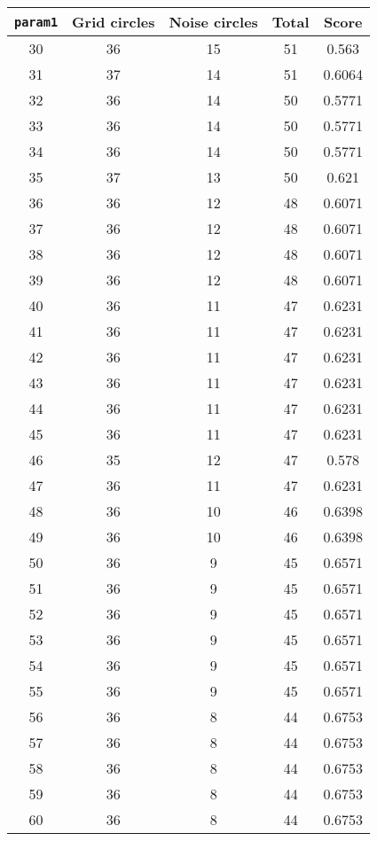 \documentclass[letterpaper, 12pt]{article}
\begin{document}
\begin{longtable}{|c|c|c|c|c|}
\hline
\textbf{\texttt{param1}} & \textbf{Grid circles} & \textbf{Noise circles} & \textbf{Total} & \textbf{Score} \\
\hline
30 & 36 & 15 & 51 & 0.563 \\
\hline
31 & 37 & 14 & 51 & 0.6064 \\
\hline
32 & 36 & 14 & 50 & 0.5771 \\
\hline
33 & 36 & 14 & 50 & 0.5771 \\
\hline
34 & 36 & 14 & 50 & 0.5771 \\
\hline
35 & 37 & 13 & 50 & 0.621 \\
\hline
36 & 36 & 12 & 48 & 0.6071 \\
\hline
37 & 36 & 12 & 48 & 0.6071 \\
\hline
38 & 36 & 12 & 48 & 0.6071 \\
\hline
39 & 36 & 12 & 48 & 0.6071 \\
\hline
40 & 36 & 11 & 47 & 0.6231 \\
\hline
41 & 36 & 11 & 47 & 0.6231 \\
\hline
42 & 36 & 11 & 47 & 0.6231 \\
\hline
43 & 36 & 11 & 47 & 0.6231 \\
\hline
44 & 36 & 11 & 47 & 0.6231 \\
\hline
45 & 36 & 11 & 47 & 0.6231 \\
\hline
46 & 35 & 12 & 47 & 0.578 \\
\hline
47 & 36 & 11 & 47 & 0.6231 \\
\hline
48 & 36 & 10 & 46 & 0.6398 \\
\hline
49 & 36 & 10 & 46 & 0.6398 \\
\hline
50 & 36 & 9 & 45 & 0.6571 \\
\hline
51 & 36 & 9 & 45 & 0.6571 \\
\hline
52 & 36 & 9 & 45 & 0.6571 \\
\hline
53 & 36 & 9 & 45 & 0.6571 \\
\hline
54 & 36 & 9 & 45 & 0.6571 \\
\hline
55 & 36 & 9 & 45 & 0.6571 \\
\hline
56 & 36 & 8 & 44 & 0.6753 \\
\hline
57 & 36 & 8 & 44 & 0.6753 \\
\hline
58 & 36 & 8 & 44 & 0.6753 \\
\hline
59 & 36 & 8 & 44 & 0.6753 \\
\hline
60 & 36 & 8 & 44 & 0.6753 \\

\end{longtable}
\end{document}
